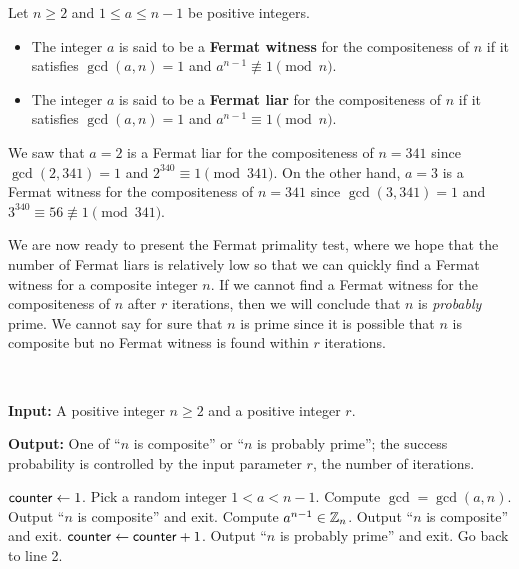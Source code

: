 \begin{defn}
Let $n \geq 2$ and $1 \leq a \leq n-1$ be positive integers.
\begin{itemize}
    \item The integer $a$ is said to be a {\bf Fermat witness} for the compositeness of $n$ if it satisfies
    $\gcd(a, n) = 1$ and $a^{n-1} \not\equiv 1 \pmod n$. 
    \item The integer $a$ is said to be a {\bf Fermat liar} for the compositeness of $n$ if it satisfies 
    $\gcd(a, n) = 1$ and $a^{n-1} \equiv 1 \pmod n$. 
\end{itemize}
\end{defn}

We saw that $a = 2$ is a Fermat liar for the compositeness of $n = 341$ since $\gcd(2, 341) = 1$
and $2^{340} \equiv 1 \pmod{341}$. On the other hand, $a = 3$ is a Fermat witness for the compositeness
of $n = 341$ since $\gcd(3, 341) = 1$ and $3^{340} \equiv 56 \not\equiv 1 \pmod{341}$. 

We are now ready to present the Fermat primality test, where we hope that the number of Fermat liars 
is relatively low so that we can quickly find a Fermat witness for a composite integer $n$. 
If we cannot find a Fermat witness for the compositeness of $n$ after $r$ iterations, 
then we will conclude that $n$ is {\it probably} prime. We cannot say for sure that $n$ is prime 
since it is possible that $n$ is composite but no Fermat witness is found within $r$ iterations.

\begin{algo}~

{\bf Input:} A positive integer $n \geq 2$ and a positive integer $r$. 

{\bf Output:} One of ``$n$ is composite'' or ``$n$ is probably prime''; the success probability is controlled by the input parameter $r$, the number of iterations. \vspace{0.5em}

\begin{algorithmic}[1]
\State ${\sf counter} \gets 1$. 
\State Pick a random integer $1 < a < n-1$. 
\State Compute $\gcd = \gcd(a, n)$. 
    \State Output ``$n$ is composite'' and exit.
\Else
    \State Compute $a^{n-1} \in \mathbb{Z}_n$. 
     
        \State Output ``$n$ is composite'' and exit. 
    \Else {}
        \State ${\sf counter} \gets {\sf counter} + 1$. 
         
            \State Output ``$n$ is probably prime'' and exit.
        \Else 
            \State Go back to line 2. 
        \EndIf 
    \EndIf
\EndIf
\end{algorithmic}
\end{algo}

